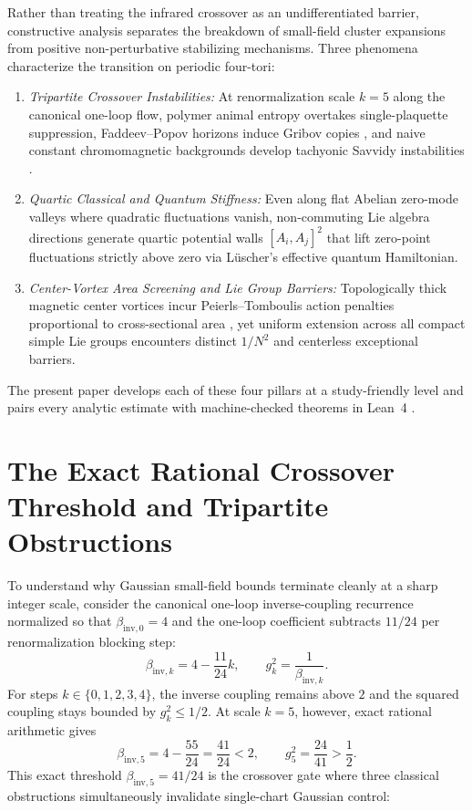 \documentclass[11pt,a4paper]{article}
\begin{document}
Rather than treating the infrared crossover as an undifferentiated barrier, constructive analysis separates the breakdown of small-field cluster expansions from positive non-perturbative stabilizing mechanisms. Three phenomena characterize the transition on periodic four-tori:
\begin{enumerate}
\item \emph{Tripartite Crossover Instabilities:} At renormalization scale $k = 5$ along the canonical one-loop flow, polymer animal entropy overtakes single-plaquette suppression, Faddeev--Popov horizons induce Gribov copies \cite{Gribov1978,Zwanziger1989}, and naive constant chromomagnetic backgrounds develop tachyonic Savvidy instabilities \cite{Savvidy1977,NielsenOlesen1978}.
\item \emph{Quartic Classical and Quantum Stiffness:} Even along flat Abelian zero-mode valleys where quadratic fluctuations vanish, non-commuting Lie algebra directions generate quartic potential walls $[A_i, A_j]^2$ that lift zero-point fluctuations strictly above zero via L\"uscher's effective quantum Hamiltonian.
\item \emph{Center-Vortex Area Screening and Lie Group Barriers:} Topologically thick magnetic center vortices incur Peierls--Tomboulis action penalties proportional to cross-sectional area \cite{tHooft1978,Tomboulis1977,Tomboulis1981}, yet uniform extension across all compact simple Lie groups encounters distinct $1/N^2$ and centerless exceptional barriers.
\end{enumerate}

The present paper develops each of these four pillars at a study-friendly level and pairs every analytic estimate with machine-checked theorems in Lean~4 \cite{Mathlib4}.

\section{The Exact Rational Crossover Threshold and Tripartite Obstructions}
To understand why Gaussian small-field bounds terminate cleanly at a sharp integer scale, consider the canonical one-loop inverse-coupling recurrence normalized so that $\beta_{\mathrm{inv}, 0} = 4$ and the one-loop coefficient subtracts $11/24$ per renormalization blocking step:
\begin{equation}
\beta_{\mathrm{inv}, k} = 4 - \frac{11}{24} k, \qquad g_k^2 = \frac{1}{\beta_{\mathrm{inv}, k}}.
\end{equation}
For steps $k \in \{0, 1, 2, 3, 4\}$, the inverse coupling remains above $2$ and the squared coupling stays bounded by $g_k^2 \le 1/2$. At scale $k = 5$, however, exact rational arithmetic gives
\begin{equation}
\beta_{\mathrm{inv}, 5} = 4 - \frac{55}{24} = \frac{41}{24} < 2, \qquad g_5^2 = \frac{24}{41} > \frac{1}{2}.
\end{equation}
This exact threshold $\beta_{\mathrm{inv}, 5} = 41/24$ is the crossover gate where three classical obstructions simultaneously invalidate single-chart Gaussian control:
\end{document}
